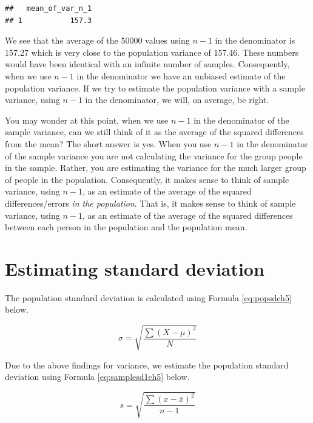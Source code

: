 \documentclass[
]{krantz}
\begin{document}
\begin{verbatim}
##   mean_of_var_n_1
## 1           157.3
\end{verbatim}

We see that the average of the 50000 values using \(n-1\) in the denominator is 157.27 which is very close to the population variance of 157.46. These numbers would have been identical with an infinite number of samples. Consequently, when we use \(n-1\) in the denominator we have an unbiased estimate of the population variance. If we try to estimate the population variance with a sample variance, using \(n-1\) in the denominator, we will, on average, be right.

You may wonder at this point, when we use \(n-1\) in the denominator of the sample variance, can we still think of it as the average of the squared differences from the mean? The short answer is yes. When you use \(n-1\) in the denominator of the sample variance you are not calculating the variance for the group people in the sample. Rather, you are estimating the variance for the much larger group of people in the population. Consequently, it makes sense to think of sample variance, using \(n-1\), as an estimate of the average of the squared differences/errors \emph{in the population}. That is, it makes sense to think of sample variance, using \(n-1\), as an estimate of the average of the squared differences between each person in the population and the population mean.

\hypertarget{estimating-standard-deviation}{%
\section{Estimating standard deviation}\label{estimating-standard-deviation}}

The population standard deviation is calculated using Formula \eqref{eq:popsdch5} below.

\begin{equation} 
\sigma = \sqrt{\frac{\sum{(X- \mu)^2}}{N}}
      \label{eq:popsdch5}
\end{equation}

Due to the above findings for variance, we estimate the population standard deviation using Formula \eqref{eq:samplesd1ch5} below.

\begin{equation} 
s = \sqrt{\frac{\sum{(x - \bar{x})^2}}{n-1}}
      \label{eq:samplesd1ch5}
\end{equation}
\end{document}

